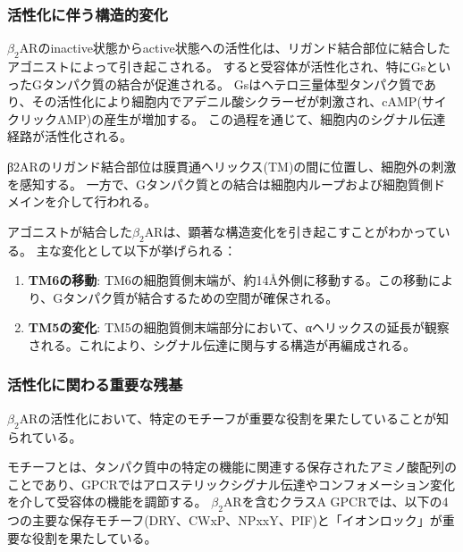 \subsubsection{活性化に伴う構造的変化}
$\beta_2$ARのinactive状態からactive状態への活性化は、リガンド結合部位に結合したアゴニストによって引き起こされる。
すると受容体が活性化され、特にGsといったGタンパク質の結合が促進される。
Gsはヘテロ三量体型タンパク質であり、その活性化により細胞内でアデニル酸シクラーゼが刺激され、cAMP(サイクリックAMP)の産生が増加する。
この過程\cite{philip2007}を通じて、細胞内のシグナル伝達経路が活性化される。

β2ARのリガンド結合部位は膜貫通ヘリックス(TM)の間に位置し、細胞外の刺激を感知する。
一方で、Gタンパク質との結合は細胞内ループおよび細胞質側ドメインを介して行われる。


アゴニストが結合した$\beta_2$ARは、顕著な構造変化を引き起こす\cite{rasmussen2011crystal}ことがわかっている。
主な変化として以下が挙げられる：
\begin{enumerate}
    \item \textbf{TM6の移動}: TM6の細胞質側末端が、約14Å外側に移動する。この移動により、Gタンパク質が結合するための空間が確保される。
    \item \textbf{TM5の変化}: TM5の細胞質側末端部分において、αヘリックスの延長が観察される。これにより、シグナル伝達に関与する構造が再編成される。
\end{enumerate}

\subsubsection{活性化に関わる重要な残基}
$\beta_2$ARの活性化において、特定のモチーフ\cite{nygaard2009ligand}\cite{lee2013mapping}が重要な役割を果たしていることが知られている。

モチーフとは、タンパク質中の特定の機能に関連する保存されたアミノ酸配列のことであり、GPCRではアロステリックシグナル伝達やコンフォメーション変化を介して受容体の機能を調節する。
$\beta_2$ARを含むクラスA GPCRでは、以下の4つの主要な保存モチーフ(DRY、CWxP、NPxxY、PIF)と「イオンロック」が重要な役割を果たしている。

